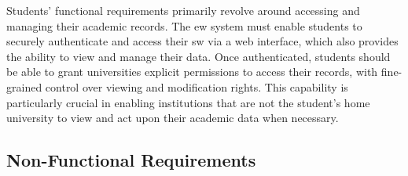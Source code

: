 Students' functional requirements primarily revolve around accessing and managing their academic records. The \acrshort{ew} system must enable students to securely authenticate and access their \acrshort{sw} via a web interface, which also provides the ability to view and manage their data. Once authenticated, students should be able to grant universities explicit permissions to access their records, with fine-grained control over viewing and modification rights. This capability is particularly crucial in enabling institutions that are not the student's home university to view and act upon their academic data when necessary.

\subsection{Non-Functional Requirements}

